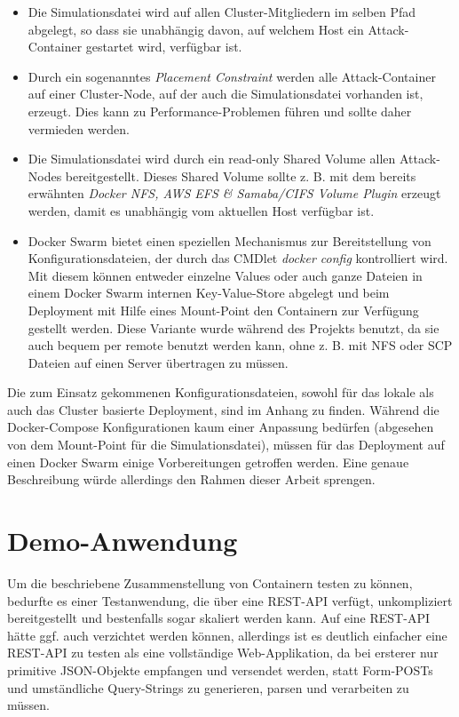 \begin{itemize}
	\item Die Simulationsdatei wird auf allen Cluster-Mitgliedern im selben Pfad abgelegt, so dass sie unabh\"angig davon, auf welchem Host ein Attack-Container gestartet wird, verf\"ugbar ist.
	\item Durch ein sogenanntes \textit{Placement Constraint} werden alle Attack-Container auf einer Cluster-Node, auf der auch die Simulationsdatei vorhanden ist, erzeugt. Dies kann zu Performance-Problemen f\"uhren und sollte daher vermieden werden.
	\item Die Simulationsdatei wird durch ein read-only Shared Volume allen Attack-Nodes bereitgestellt. Dieses Shared Volume sollte z. B. mit dem bereits erw\"ahnten \textit{Docker NFS, AWS EFS \& Samaba/CIFS Volume Plugin} erzeugt werden, damit es unabh\"angig vom aktuellen Host verf\"ugbar ist.
	\item Docker Swarm bietet einen speziellen Mechanismus zur Bereitstellung von Konfigurationsdateien, der durch das CMDlet \textit{docker config} kontrolliert wird. Mit diesem k\"onnen entweder einzelne Values oder auch ganze Dateien in einem Docker Swarm internen Key-Value-Store abgelegt und beim Deployment mit Hilfe eines Mount-Point den Containern zur Verf\"ugung gestellt werden. Diese Variante wurde w\"ahrend des Projekts benutzt, da sie auch bequem per remote benutzt werden kann, ohne z. B. mit NFS oder SCP Dateien auf einen Server \"ubertragen zu m\"ussen.
\end{itemize}

Die zum Einsatz gekommenen Konfigurationsdateien, sowohl f\"ur das lokale als auch das Cluster basierte Deployment, sind im Anhang zu finden.
W\"ahrend die Docker-Compose Konfigurationen kaum einer Anpassung bed\"urfen (abgesehen von dem Mount-Point f\"ur die Simulationsdatei), m\"ussen f\"ur das Deployment auf einen Docker Swarm einige Vorbereitungen getroffen werden.
Eine genaue Beschreibung w\"urde allerdings den Rahmen dieser Arbeit sprengen.

\section{Demo-Anwendung}

Um die beschriebene Zusammenstellung von Containern testen zu k\"onnen, bedurfte es einer Testanwendung, die \"uber eine REST-API verf\"ugt, unkompliziert bereitgestellt und bestenfalls sogar skaliert werden kann.
Auf eine REST-API h\"atte ggf. auch verzichtet werden k\"onnen, allerdings ist es deutlich einfacher eine REST-API zu testen als eine vollst\"andige Web-Applikation, da bei ersterer nur primitive JSON-Objekte empfangen und versendet werden, statt Form-POSTs und umst\"andliche Query-Strings zu generieren, parsen und verarbeiten zu m\"ussen.

